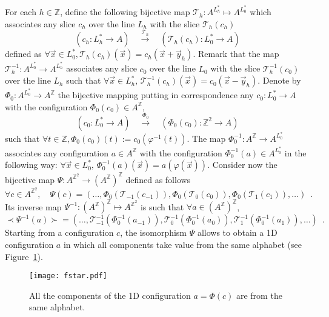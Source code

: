 \documentclass{llncs}
\newcommand{\z}{\ensuremath{\mathbb{Z}}\xspace}
\newcommand{\az}{\ensuremath{A^{\mathbb{Z}}}\xspace}
\newcommand{\zdu}{\ensuremath{\mathbb{Z}^2}\xspace}
\newcommand{\azdu}{\ensuremath{A^{\zdu}}\xspace}
\newcommand{\Tr}{\ensuremath{\mathcal{T}}}
\newcommand{\xx}{\vec x}
\newcommand{\yy}{\vec y}
\begin{document}
For each $h\in\z$, define the following bijective map $\Tr_{h}:
A^{L^*_{h}}\mapsto A^{L^*_{0}}$ which associates any slice $c_{h}$
over the line $L_{h}$ with the slice $\Tr_{h}(c_{h})$
\[
  \left( c_{h}: L^*_{h}\to A\right)\quad \xrightarrow{\Tr_{h}}
 \quad \left(\Tr_{h}(c_{h}):
 L^*_{0}\to A\right)
\]
defined as $\forall \xx\in L^*_{0},
\Tr_{h}(c_{h})(\xx)=c_{h}(\xx+\yy_h).$ Remark that the map
$\Tr^{-1}_h: A^{L^*_{0}}\to A^{L^*_{h}}$ associates any slice
$c_{0}$ over the line $L_{0}$ with the slice $\Tr^{-1}_{h}(c_{0})$
over the line $L_{h}$ such that $\forall \xx\in L^*_{h},\,
\Tr^{-1}_{h}(c_{h})(\xx)=c_{0}(\xx-\yy_h)$. Denote by
$\Phi_0:A^{L^*_{0}}\to\az$ the bijective mapping putting in
correspondence any $c_0:L^*_{0}\to A$ with the configuration
$\Phi_{0}(c_0)\in\az$,
\[
 \left( c_{0}: L^*_{0}\to A \right)\quad \xrightarrow{\Phi_0}
 \quad \left(\Phi_{0}(c_{0}): \zdu\to A\right)
\]
such that $\forall t\in \z, \Phi_{0}(c_{0})(t):=
c_{0}(\varphi^{-1}(t))$.
The map $\Phi_0^{-1}: \az\to A^{L^*_{0}} $ associates any
configuration $a\in\az$ with the configuration $\Phi^{-1}_0(a)\in
A^{L^*_0}$ in the following way: $ \forall \xx\in L_0^*,\,
\Phi^{-1}_0(a)(\xx)=a(\varphi(\xx))$. Consider now the bijective
map $\Psi:\azdu\to (\az)^{\z}$ defined as follows
\[
\forall c\in\azdu, \quad \Psi(c)= (\ldots,
\Phi_0(\Tr_{-1}(c_{-1})), \Phi_0(\Tr_{0}(c_{0})),
\Phi_0(\Tr_{1}(c_{1})), \ldots)\enspace.
\]
Its inverse map $\Psi^{-1}:(\az)^{\z}\mapsto\azdu$ is such that
$\forall a\in(\az)^{\z}$,
\[
 \prec\Psi^{-1}(a)\succ= (\ldots,
\Tr_{-1}^{-1}(\Phi_0^{-1}(a_{-1})),
\Tr_{0}^{-1}(\Phi_0^{-1}(a_{0})),
\Tr_{1}^{-1}(\Phi_0^{-1}(a_{1})), \ldots)\enspace.
\]
Starting from a configuration $c$, the isomorphism $\Psi$ allows
to obtain a 1D configuration $a$ in which all components take
value from the same alphabet (see Figure~\ref{fig:same-alph}).
\begin{figure}[!htb]
  \begin{center}
     \texttt{[image: fstar.pdf]}
   \end{center}
   \caption{All the components of the 1D configuration
   $a=\Phi(c)$ are from the same alphabet.}
 \label{fig:same-alph}
\end{figure}
\end{document}
